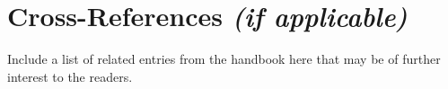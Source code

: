 \documentclass[graybox, nosecnum]{svmult}
\begin{document}
\section{Cross-References \textit{(if applicable)}}
Include a list of related entries from the handbook here that may be of further interest to the readers.



\end{document}
